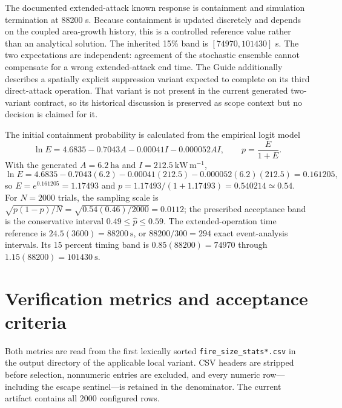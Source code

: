The documented extended-attack known response is containment and simulation termination at 88200 s. Because containment is updated discretely and depends on the coupled area-growth history, this is a controlled reference value rather than an analytical solution. The inherited 15\% band is $[74970,101430]$ s. The two expectations are independent: agreement of the stochastic ensemble cannot compensate for a wrong extended-attack end time. The Guide additionally describes a spatially explicit suppression variant expected to complete on its third direct-attack operation. That variant is not present in the current generated two-variant contract, so its historical discussion is preserved as scope context but no decision is claimed for it.

The initial containment probability is calculated from the empirical
logit model
\[
 \ln E=4.6835-0.7043A-0.00041I-0.000052AI,\qquad
 p=\frac{E}{1+E}.
\]
With the generated \(A=6.2~\mathrm{ha}\) and
\(I=212.5~\mathrm{kW\,m^{-1}}\),
\[
 \ln E=4.6835-0.7043(6.2)-0.00041(212.5)
       -0.000052(6.2)(212.5)=0.161205,
\]
so \(E=e^{0.161205}=1.17493\) and
\(p=1.17493/(1+1.17493)=0.540214\simeq0.54\).
For \(N=2000\) trials, the sampling scale is
\(\sqrt{p(1-p)/N}=\sqrt{0.54(0.46)/2000}=0.0112\); the prescribed
acceptance band is the conservative interval \(0.49\leq\hat p\leq0.59\).
The extended-operation time reference is
\(24.5(3600)=88200~\mathrm{s}\), or \(88200/300=294\) exact
event-analysis intervals.  Its 15 percent timing band is
\(0.85(88200)=74970\) through \(1.15(88200)=101430~\mathrm{s}\).

\section{Verification metrics and acceptance criteria}

Both metrics are read from the first lexically sorted \texttt{fire\_size\_stats*.csv} in the output directory of the applicable local variant. CSV headers are stripped before selection, nonnumeric entries are excluded, and every numeric row---including the escape sentinel---is retained in the denominator. The current artifact contains all 2000 configured rows.

